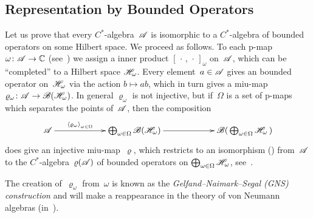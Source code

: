 \documentclass[a]{subfiles}
\begin{document}
\subsection{Representation by Bounded Operators}
\begin{parsec}%
    \begin{point}%
Let us prove that every $C^*$-algebra~$\mathscr{A}$
is isomorphic
to a $C^*$-algebra
of bounded operators on some Hilbert space.
We proceed as follows.
To each p-map $\omega\colon \mathscr{A}\to\mathbb{C}$
(see~)
we assign a inner product $[\,\cdot\,,\,\cdot\,]_\omega$ on~$\mathscr{A}$,
which can be ``completed'' to a Hilbert space $\mathscr{H}_\omega$.
Every element~$a\in \mathscr{A}$ gives an bounded operator on~$\mathscr{H}_\omega$
via the action $b\mapsto ab$, which in turn gives a 
miu-map $\varrho_\omega\colon \mathscr{A}\to \mathscr{B} (\mathscr{H}_\omega)$.
In general $\varrho_\omega$ is not injective,
but if~$\Omega$ is a set of p-maps which separates the
points of~$\mathscr{A}$,
then the composition
\begin{equation*}
	\xymatrix@C=6em{
		\scrA\ar[r]^-{\left<\varrho_\omega\right>_{\omega\in \Omega}}
		&
		\bigoplus_{\omega\in\Omega} \scrB(\scrH_\omega)
		\ar[r]
		&
		\scrB(\,\bigoplus_{\omega\in\Omega}\scrH_\omega\,)
	}
\end{equation*}
does give an injective miu-map~$\varrho$,
which restricts to an isomorphism 
()
from~$\mathscr{A}$
to the $C^*$-algebra~$\varrho(\mathscr{A})$
of bounded operators
on $\bigoplus_{\omega\in \Omega} \mathscr{H}_\omega$,
see~.

The creation of~$\varrho_\omega$ from~$\omega$
is known as the \emph{Gelfand--Naimark--Segal (GNS) construction}%
and will make a reappearance in the theory of von Neumann algebras
(in~).


\end{point}
\end{parsec}
\end{document}
